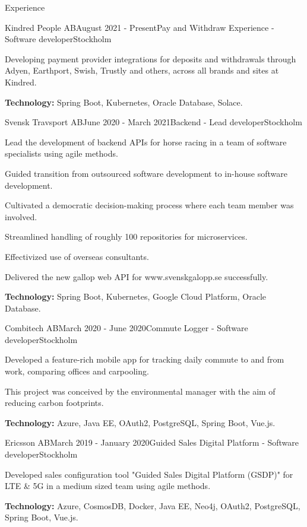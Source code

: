 \documentclass{resume}
\begin{document}
  \begin{rSection}{Experience}
      \begin{rSubsection}{Kindred People AB}{August 2021 - Present}{Pay and Withdraw Experience - Software developer}{Stockholm}
      \item Developing payment provider integrations for deposits and withdrawals through Adyen, Earthport, Swish, Trustly and others, across all brands and sites at Kindred. 
      \item \textbf{Technology:} Spring Boot, Kubernetes, Oracle Database, Solace.
    \end{rSubsection}
    
    \begin{rSubsection}{Svensk Travsport AB}{June 2020 - March 2021}{Backend - Lead developer}{Stockholm}
      \item Lead the development of backend APIs for horse racing in a team of software specialists using agile methods.
      \item Guided transition from outsourced software development to in-house software development.
      \item Cultivated a democratic decision-making process where each team member was involved.
      \item Streamlined handling of roughly 100 repositories for microservices.
      \item Effectivized use of overseas consultants.
      \item Delivered the new gallop web API for www.svenskgalopp.se successfully.
      \item \textbf{Technology:} Spring Boot, Kubernetes, Google Cloud Platform, Oracle Database.
    \end{rSubsection}

    \begin{rSubsection}{Combitech AB}{March 2020 - June 2020}{Commute Logger - Software developer}{Stockholm}
      \item Developed a feature-rich mobile app for tracking daily commute to and from work, comparing offices and carpooling.
      \item This project was conceived by the environmental manager with the aim of reducing carbon footprints.
      \item \textbf{Technology:} Azure, Java EE, OAuth2, PostgreSQL, Spring Boot, Vue.js.
    \end{rSubsection}

    \begin{rSubsection}{Ericsson AB}{March 2019 - January 2020}{Guided Sales Digital Platform - Software developer}{Stockholm}
      \item Developed sales configuration tool "Guided Sales Digital Platform (GSDP)" for LTE \& 5G in a medium sized team using agile methods.
      \item \textbf{Technology:} Azure, CosmosDB, Docker, Java EE, Neo4j, OAuth2, PostgreSQL, Spring Boot, Vue.js.
    \end{rSubsection}


\end{rSection}
\end{document}
